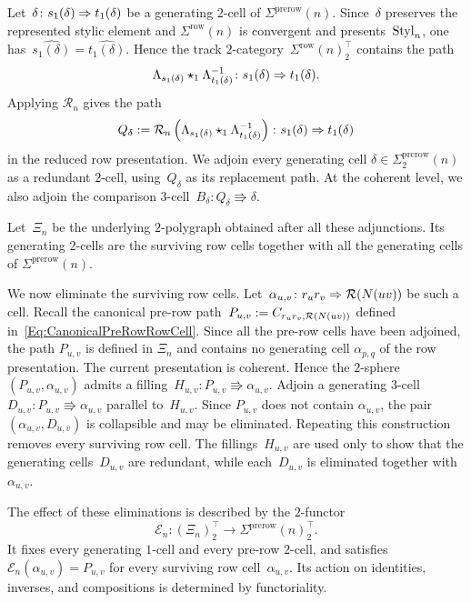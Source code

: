 \documentclass[a4paper, twoside, 11pt, english]{article}
\newcommand{\npath}[1]{\Lambda_{#1}}
\begin{document}
Let~$
\delta\colon
s_1(\delta)\Rightarrow t_1(\delta)$
be a generating $2$-cell of
$\Sigma^{\mathrm{prerow}}(n)$. 
Since~$\delta$ preserves the represented stylic element and
$\Sigma^{\mathrm{row}}(n)$ is convergent and presents~$\mathrm{Styl}_n$, one has~$\widehat{s_1(\delta)}=\widehat{t_1(\delta)}$.
Hence the track $2$-category~$\Sigma^{\mathrm{row}}(n)_2^\top$ contains the path
\[
\npath{s_1(\delta)}
\star_1
\npath{t_1(\delta)}^{-1}
\colon
s_1(\delta)\dfl t_1(\delta).
\]
Applying $\mathcal R_n$ gives the path
\[
Q_\delta
:=
\mathcal R_n
\left(
\npath{s_1(\delta)}
\star_1
\npath{t_1(\delta)}^{-1}
\right)
\colon
s_1(\delta)\dfl t_1(\delta)
\]
in the reduced row presentation.
We adjoin every generating cell
$\delta\in\Sigma^{\mathrm{prerow}}_2(n)$ as a redundant $2$-cell,
using~$Q_\delta$ as its replacement path. At the coherent level, we
also adjoin the comparison $3$-cell~$
B_\delta\colon
Q_\delta\Rrightarrow\delta$.

Let~$\Xi_n$ be the underlying $2$-polygraph obtained after all these
adjunctions. Its generating $2$-cells are the surviving row cells
together with all the generating cells of
$\Sigma^{\mathrm{prerow}}(n)$.

We now eliminate the surviving row cells. Let~$
\alpha_{u,v}\colon
r_ur_v\Rightarrow\mathcal{R}(N(uv))$
be such a cell. Recall the canonical pre-row path~$
P_{u,v}
:=
C_{r_ur_v,\mathcal{R}(N(uv))}$
defined in~\eqref{Eq:CanonicalPreRowRowCell}. 
Since all the pre-row cells have been adjoined, the path $P_{u,v}$ is
defined in $\Xi_n$ and contains no generating cell
$\alpha_{p,q}$ of the row presentation.
The current presentation is coherent. Hence the $2$-sphere
$(P_{u,v},\alpha_{u,v})$ admits a filling~$
H_{u,v}\colon
P_{u,v}\Rrightarrow\alpha_{u,v}$.
Adjoin a generating $3$-cell~$
D_{u,v}\colon
P_{u,v}\Rrightarrow\alpha_{u,v}$
parallel to~$H_{u,v}$. Since $P_{u,v}$ does not contain
$\alpha_{u,v}$, the pair~$(\alpha_{u,v},D_{u,v})$ is collapsible and may be eliminated.
Repeating this construction removes every surviving row cell. The
fillings~$H_{u,v}$ are used only to show that the generating cells~$D_{u,v}$ are redundant, while each~$D_{u,v}$ is eliminated together with~$\alpha_{u,v}$.

The effect of these eliminations is described by the $2$-functor
\[
\mathcal E_n\colon
(\Xi_n)_2^\top
\longrightarrow
\Sigma^{\mathrm{prerow}}(n)_2^\top.
\]
It fixes every generating $1$-cell and every pre-row $2$-cell, and
satisfies~$\mathcal E_n(\alpha_{u,v})=P_{u,v}$ for every surviving row cell~$\alpha_{u,v}$. Its action on identities,
inverses, and compositions is determined by functoriality.
\end{document}
